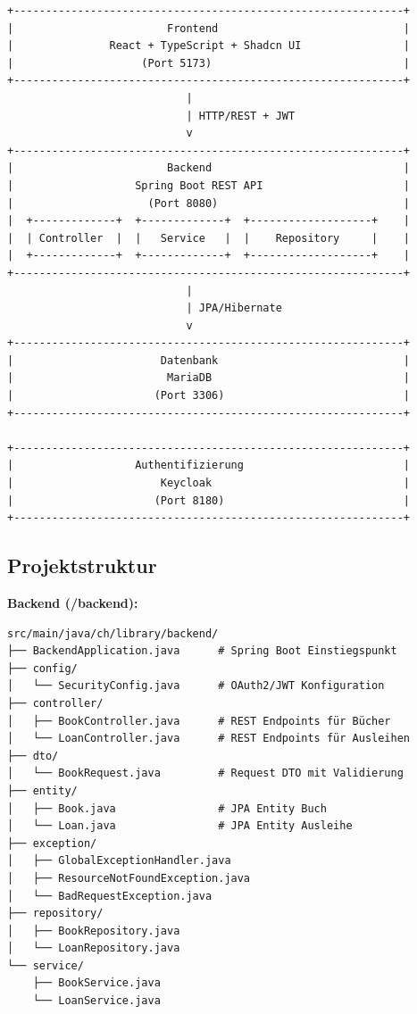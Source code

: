 \documentclass[a4paper,12pt,twoside]{report}
\begin{document}
\begin{verbatim}
+-------------------------------------------------------------+
|                        Frontend                             |
|               React + TypeScript + Shadcn UI                |
|                    (Port 5173)                              |
+-------------------------------------------------------------+
                            |
                            | HTTP/REST + JWT
                            v
+-------------------------------------------------------------+
|                        Backend                              |
|                   Spring Boot REST API                      |
|                     (Port 8080)                             |
|  +-------------+  +-------------+  +-------------------+    |
|  | Controller  |  |   Service   |  |    Repository     |    |
|  +-------------+  +-------------+  +-------------------+    |
+-------------------------------------------------------------+
                            |
                            | JPA/Hibernate
                            v
+-------------------------------------------------------------+
|                       Datenbank                             |
|                        MariaDB                              |
|                      (Port 3306)                            |
+-------------------------------------------------------------+

+-------------------------------------------------------------+
|                   Authentifizierung                         |
|                       Keycloak                              |
|                      (Port 8180)                            |
+-------------------------------------------------------------+
\end{verbatim}

\newpage

\subsection{Projektstruktur}

\textbf{Backend (/backend):}
\begin{verbatim}
src/main/java/ch/library/backend/
├── BackendApplication.java      # Spring Boot Einstiegspunkt
├── config/
│   └── SecurityConfig.java      # OAuth2/JWT Konfiguration
├── controller/
│   ├── BookController.java      # REST Endpoints für Bücher
│   └── LoanController.java      # REST Endpoints für Ausleihen
├── dto/
│   └── BookRequest.java         # Request DTO mit Validierung
├── entity/
│   ├── Book.java                # JPA Entity Buch
│   └── Loan.java                # JPA Entity Ausleihe
├── exception/
│   ├── GlobalExceptionHandler.java
│   ├── ResourceNotFoundException.java
│   └── BadRequestException.java
├── repository/
│   ├── BookRepository.java
│   └── LoanRepository.java
└── service/
    ├── BookService.java
    └── LoanService.java
\end{verbatim}
\end{document}
